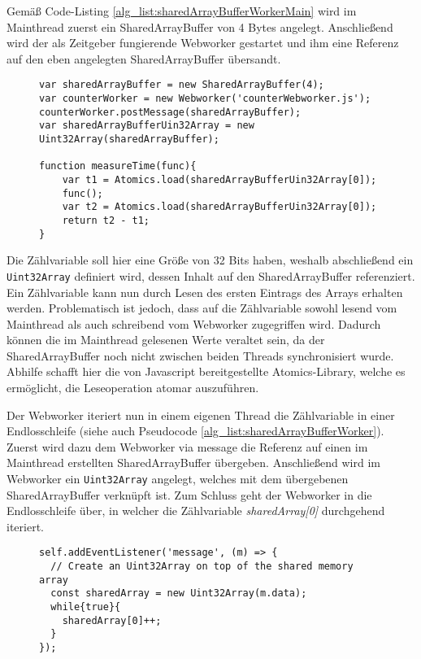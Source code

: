Gemäß Code-Listing \ref{alg_list:sharedArrayBufferWorkerMain} wird im Mainthread zuerst ein SharedArrayBuffer von 4 Bytes angelegt. Anschließend wird der als Zeitgeber fungierende Webworker gestartet und ihm eine Referenz auf den eben angelegten SharedArrayBuffer übersandt. 

\begin{figure}[h]
\begin{lstlisting}[caption=main.js: Code für Zeitmessungen mittels counterWorker,label=alg_list:sharedArrayBufferWorkerMain]
var sharedArrayBuffer = new SharedArrayBuffer(4);
var counterWorker = new Webworker('counterWebworker.js');
counterWorker.postMessage(sharedArrayBuffer);
var sharedArrayBufferUin32Array = new Uint32Array(sharedArrayBuffer);

function measureTime(func){
    var t1 = Atomics.load(sharedArrayBufferUin32Array[0]);
    func();
    var t2 = Atomics.load(sharedArrayBufferUin32Array[0]);
    return t2 - t1;
}
\end{lstlisting}
\end{figure}

Die Zählvariable soll hier eine Größe von 32 Bits haben, weshalb abschließend ein \lstinline{Uint32Array} definiert wird, dessen Inhalt auf den SharedArrayBuffer referenziert. 
Ein Zählvariable kann nun durch Lesen des ersten Eintrags des Arrays erhalten werden. 
Problematisch ist jedoch, dass auf die Zählvariable sowohl lesend vom Mainthread als auch schreibend vom Webworker zugegriffen wird. 
Dadurch können die im Mainthread gelesenen Werte veraltet sein, da der SharedArrayBuffer noch nicht zwischen beiden Threads synchronisiert wurde. 
Abhilfe schafft hier die von Javascript bereitgestellte Atomics-Library, welche es ermöglicht, die Leseoperation atomar auszuführen.

Der Webworker iteriert nun in einem eigenen Thread die Zählvariable in einer Endlosschleife (siehe auch Pseudocode \ref{alg_list:sharedArrayBufferWorker}). 
Zuerst wird dazu dem Webworker via message die Referenz auf einen im Mainthread erstellten SharedArrayBuffer übergeben.
Anschließend wird im Webworker ein \lstinline{Uint32Array} angelegt, welches mit dem übergebenen SharedArrayBuffer verknüpft ist. 
Zum Schluss geht der Webworker in die Endlosschleife über, in welcher die Zählvariable \textit{sharedArray[0]} durchgehend iteriert.

\begin{figure}[h]
\begin{lstlisting}[caption=counterWebworker.js: Iterieren der Zählvariable in einer Endlosschleife mittels Webworker,label=alg_list:sharedArrayBufferWorker]
self.addEventListener('message', (m) => {
  // Create an Uint32Array on top of the shared memory array 
  const sharedArray = new Uint32Array(m.data);
  while{true}{
    sharedArray[0]++;
  }
});
\end{lstlisting}
\end{figure}

